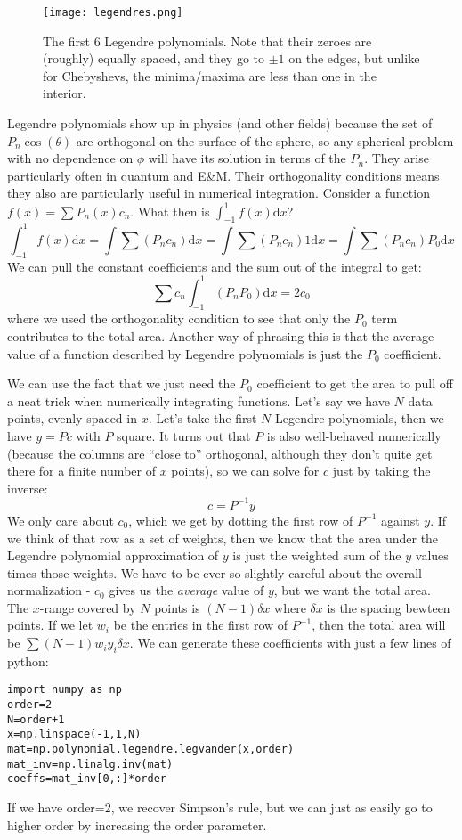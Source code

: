 \documentclass[12]{article}
\begin{document}
\begin{figure}[!h]
  \texttt{[image: legendres.png]}

  \caption{The first 6 Legendre polynomials.  Note that their zeroes
    are (roughly) equally spaced, and they go to $\pm 1$ on the edges,
    but unlike for Chebyshevs, the minima/maxima are less than one in
    the interior.}
  \label{fig:legs}
\end{figure}



Legendre polynomials show up in physics (and other fields) because
the set of $P_n{\cos(\theta)}$ are orthogonal on the surface of the
sphere, so any spherical problem with no dependence on $\phi$ will
have its solution in terms of the $P_n$.  They arise particularly
often in quantum and E\&M.  Their orthogonality conditions means they
also are particularly useful in numerical integration.  Consider a
function $f(x)=\sum P_n(x) c_n$.  What then is $\int_{-1}^{1} f(x)
\mathrm{d}x$?
$$\int_{-1}^{1} f(x) \mathrm{d}x = \int \sum ( P_n c_n) \mathrm{d}x =
\int \sum ( P_n c_n) 1 \mathrm{d}x = \int \sum ( P_n c_n) P_0 \mathrm{d}x$$
We can pull the constant coefficients and the sum out of the integral
to get:
$$\sum c_n \int_{-1}^{1}(P_n P_0) \mathrm{d}x = 2c_0$$
where we used the orthogonality condition to see that only the $P_0$
term contributes to the total area.  Another way of phrasing this is
that the average value of a function described by Legendre polynomials
is just the $P_0$ coefficient.  

We can use the fact that we just need the $P_0$ coefficient to get the
area to pull off a neat trick when numerically integrating functions.
Let's say we have $N$ data points, evenly-spaced in $x$.  Let's take
the first $N$ Legendre polynomials, then we have $y=Pc$ with $P$
square.  It turns out that $P$ is also well-behaved numerically
(because the columns are ``close to'' orthogonal, although they don't
quite get there for a finite number of $x$ points), so we can solve
for $c$ just by taking the inverse:
$$c=P^{-1}y$$
We only care about $c_0$, which we get by dotting the first row of
$P^{-1}$ against $y$.  If we think of that row as a set of weights,
then we know that the area under the Legendre polynomial approximation
of $y$ is just the weighted sum of the $y$ values times those
weights.  We have to be ever so slightly careful about the overall
normalization - $c_0$ gives us the \textit{average} value of $y$, but
we want the total area.  The $x$-range covered by $N$ points is
$(N-1)\delta x$ where $\delta x$ is the spacing bewteen points.  If we
let $w_i$ be the entries in the first row of $P^{-1}$, then the total
area will be $\sum (N-1) w_i y_i \delta x$.  We can generate these
coefficients with just a few lines of python:
\begin{verbatim}
import numpy as np
order=2
N=order+1
x=np.linspace(-1,1,N)
mat=np.polynomial.legendre.legvander(x,order)
mat_inv=np.linalg.inv(mat)
coeffs=mat_inv[0,:]*order
\end{verbatim}
If we have order=2, we recover Simpson's rule, but we can just as
easily go to higher order by increasing the order parameter.
\end{document}
